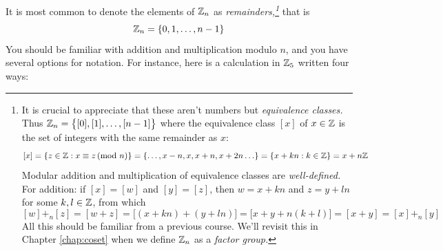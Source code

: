 It is most common to denote the elements of $\mathbb{Z}_n$ as \emph{remainders,\footnote{It is crucial to appreciate that these aren't numbers but \emph{equivalence classes.} Thus $\mathbb{Z}_n=\bigl\{[0],[1],\ldots,[n-1]\bigr\}$ where the equivalence class $[x]$ of $x\in\mathbb{Z}$ is the set of integers with the same remainder as $x$:
\[[x]=\{z\in\mathbb{Z}:x\equiv z\negthickspace\pmod n\}=\{\ldots,x-n,x,x+n,x+2n\ldots\} =\{x+kn:k\in\mathbb{Z}\} =x+n\mathbb{Z}\]
Modular addition and multiplication of equivalence classes are \emph{well-defined.} For addition: if $[x]=[w]$ and $[y]=[z]$, then $w=x+kn$ and $z=y+ln$ for some $k,l\in\mathbb{Z}$, from which
\[[w]+_n[z]=[w+z]=\bigl[(x+kn)+(y+ln)\bigr]=\bigl[x+y+n(k+l)\bigr]=[x+y]=[x]+_n[y]\]
All this should be familiar from a previous course. We'll revisit this in Chapter \ref{chap:coset} when we define $\mathbb{Z}_n$ as a \emph{factor group.}}} that is
\[\mathbb{Z}_n=\{0,1,\ldots,n-1\}\]
You should be familiar with addition and multiplication modulo $n$, and you have several options for notation. For instance, here is a calculation in $\mathbb{Z}_5$ written four ways:\par
